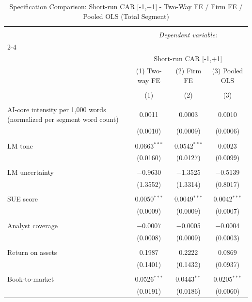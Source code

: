 
\begin{table}[!htbp] \centering 
  \caption{Specification Comparison: Short-run CAR [-1,+1] - Two-Way FE / Firm FE / Pooled OLS (Total Segment)} 
  \label{} 
\begin{tabular}{@{\extracolsep{5pt}}lccc} 
\\[-1.8ex]\hline 
\hline \\[-1.8ex] 
 & \multicolumn{3}{c}{\textit{Dependent variable:}} \\ 
\cline{2-4} 
\\[-1.8ex] & \multicolumn{3}{c}{Short-run CAR [-1,+1]} \\ 
 & (1) Two-way FE & (2) Firm FE & (3) Pooled OLS \\ 
\\[-1.8ex] & (1) & (2) & (3)\\ 
\hline \\[-1.8ex] 
 AI-core intensity per 1,000 words (normalized per segment word count) & 0.0011 & 0.0003 & 0.0010 \\ 
  & (0.0010) & (0.0009) & (0.0006) \\ 
  & & & \\ 
 LM tone & 0.0663$^{***}$ & 0.0542$^{***}$ & 0.0023 \\ 
  & (0.0160) & (0.0127) & (0.0099) \\ 
  & & & \\ 
 LM uncertainty & $-$0.9630 & $-$1.3525 & $-$0.5139 \\ 
  & (1.3552) & (1.3314) & (0.8017) \\ 
  & & & \\ 
 SUE score & 0.0050$^{***}$ & 0.0049$^{***}$ & 0.0042$^{***}$ \\ 
  & (0.0009) & (0.0009) & (0.0007) \\ 
  & & & \\ 
 Analyst coverage & $-$0.0007 & $-$0.0005 & $-$0.0004 \\ 
  & (0.0008) & (0.0009) & (0.0003) \\ 
  & & & \\ 
 Return on assets & 0.1987 & 0.2222 & 0.0869 \\ 
  & (0.1401) & (0.1432) & (0.0937) \\ 
  & & & \\ 
 Book-to-market & 0.0526$^{***}$ & 0.0443$^{**}$ & 0.0205$^{***}$ \\ 
  & (0.0191) & (0.0186) & (0.0060) \\ 

\end{tabular}
\end{table}
